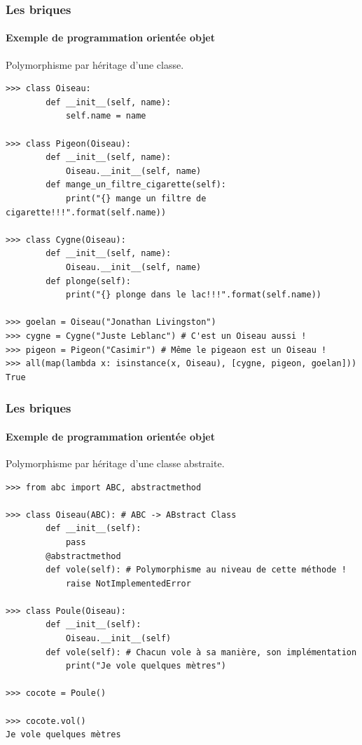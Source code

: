\documentclass{beamer}
\begin{document}
    \begin{frame}[fragile]
        \transdissolve
        \frametitle{Les briques}
        \framesubtitle{Exemple de programmation orientée objet}
        Polymorphisme par héritage d'une classe.
        \begin{lstlisting}
>>> class Oiseau:
        def __init__(self, name):
            self.name = name

>>> class Pigeon(Oiseau):
        def __init__(self, name):
            Oiseau.__init__(self, name)
        def mange_un_filtre_cigarette(self):
            print("{} mange un filtre de cigarette!!!".format(self.name))

>>> class Cygne(Oiseau):
        def __init__(self, name):
            Oiseau.__init__(self, name)
        def plonge(self):
            print("{} plonge dans le lac!!!".format(self.name))

>>> goelan = Oiseau("Jonathan Livingston")
>>> cygne = Cygne("Juste Leblanc") # C'est un Oiseau aussi !
>>> pigeon = Pigeon("Casimir") # Même le pigeaon est un Oiseau !
>>> all(map(lambda x: isinstance(x, Oiseau), [cygne, pigeon, goelan]))
True
        \end{lstlisting}
    \end{frame}

    \begin{frame}[fragile]
        \transdissolve
        \frametitle{Les briques}
        \framesubtitle{Exemple de programmation orientée objet}
        Polymorphisme par héritage d'une classe abstraite.
        \begin{lstlisting}
>>> from abc import ABC, abstractmethod

>>> class Oiseau(ABC): # ABC -> ABstract Class
        def __init__(self):
            pass
        @abstractmethod
        def vole(self): # Polymorphisme au niveau de cette méthode !
            raise NotImplementedError

>>> class Poule(Oiseau):
        def __init__(self):
            Oiseau.__init__(self)
        def vole(self): # Chacun vole à sa manière, son implémentation
            print("Je vole quelques mètres")

>>> cocote = Poule()

>>> cocote.vol()
Je vole quelques mètres
        \end{lstlisting}
    \end{frame}
\end{document}
